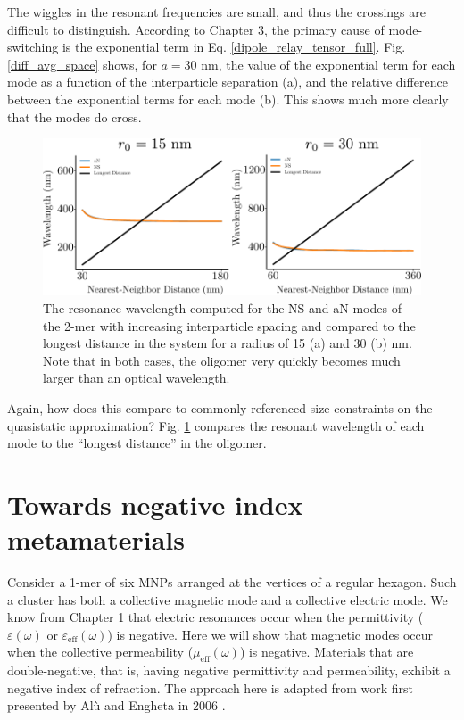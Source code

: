 \documentclass [11pt, proquest] {uwthesis}[2016/11/22]
\begin{document}
The wiggles in the resonant frequencies are small, and thus the crossings are difficult to distinguish. According to Chapter 3, the primary cause of mode-switching is the exponential term in Eq. \ref{dipole_relay_tensor_full}. Fig. \ref{diff_avg_space} shows, for $a=30$ nm, the value of the exponential term for each mode as a function of the interparticle separation (a), and the relative difference between the exponential terms for each mode (b). This shows much more clearly that the modes do cross.

\begin{figure}
\begin{centering}
\includegraphics{length_comp_sapcing.pdf}
\caption{The resonance wavelength computed for the NS and aN modes of the 2-mer with increasing interparticle spacing and compared to the longest distance in the system for a radius of 15 (a) and 30 (b) nm. Note that in both cases, the oligomer very quickly becomes much larger than an optical wavelength.}
\label{length_space}
\end{centering}
\end{figure}


Again, how does this compare to commonly referenced size constraints on the quasistatic approximation? Fig. \ref{length_space} compares the resonant wavelength of each mode to the ``longest distance'' in the oligomer.


\section{Towards negative index metamaterials}

Consider a 1-mer of six MNPs arranged at the vertices of a regular hexagon. Such a cluster has both a collective magnetic mode and a collective electric mode. We know from Chapter 1 that electric resonances occur when the permittivity ($\varepsilon(\omega)$ or $\varepsilon_{\textrm{eff}}(\omega)$) is negative. Here we will show that magnetic modes occur when the collective permeability ($\mu_{\textrm{eff}}(\omega)$) is negative. Materials that are double-negative, that is, having negative permittivity and permeability, exhibit a negative index of refraction. The approach here is adapted from work first presented by Al\`{u} and Engheta in 2006 \cite{Alu2006}.
\end{document}
